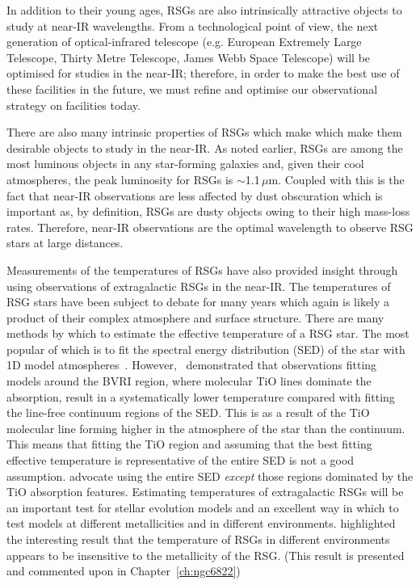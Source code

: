 In addition to their young ages, RSGs are also intrinsically attractive objects to study at near-IR wavelengths.
From a technological point of view, the next generation of optical-infrared telescope (e.g. European Extremely Large Telescope, Thirty Metre Telescope, James Webb Space Telescope) will be optimised for studies in the near-IR; therefore, in order to make the best use of these facilities in the future, we must refine and optimise our observational strategy on facilities today.

There are also many intrinsic properties of RSGs which make  which make them desirable objects to study in the near-IR.
As noted earlier, RSGs are among the most luminous objects in any star-forming galaxies and, given their cool atmospheres, the peak luminosity for RSGs is $\sim$1.1\,$\mu$m.
Coupled with this is the fact that near-IR observations are less affected by dust obscuration which is important as, by definition, RSGs are dusty objects owing to their high mass-loss rates.
Therefore, near-IR observations are the optimal wavelength to observe RSG stars at large distances.

Measurements of the temperatures of RSGs have also provided insight through using observations of extragalactic RSGs in the near-IR.
The temperatures of RSG stars have been subject to debate for many years which again is likely a product of their complex atmosphere and surface structure.
There are many methods by which to estimate the effective temperature of a RSG star.
The most popular of which is to fit the spectral energy distribution (SED) of the star with 1D model atmospheres~\citep{Levesque05,Levesque06}.
However,~\cite{2013ApJ...767....3D} demonstrated that observations fitting models around the BVRI region, where molecular TiO lines dominate the absorption, result in a systematically lower temperature compared with fitting the line-free continuum regions of the SED.
This is as a result of the TiO molecular line forming higher in the atmosphere of the star than the continuum.
This means that fitting the TiO region and assuming that the best fitting effective temperature is representative of the entire SED is not a good assumption.
\cite{2013ApJ...767....3D} advocate using the entire SED \textit{except} those regions dominated by the TiO absorption features.
Estimating temperatures of extragalactic RSGs will be an important test for stellar evolution models and an excellent way in which to test models at different metallicities and in different environments.
\cite{2015ApJ...803...14P} highlighted the interesting result that the temperature of RSGs in different environments appears to be insensitive to the metallicity of the RSG. (This result is presented and commented upon in Chapter~\ref{ch:ngc6822})

